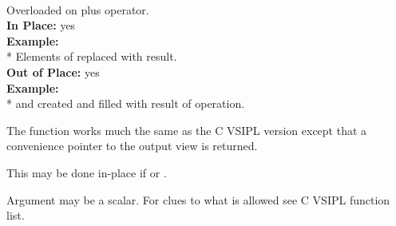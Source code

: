 \pyjvsiph
\\\vmthdh
\hspace*{.06\textwidth}Overloaded on plus operator.\\
\hspace*{.06\textwidth}\textbf{In Place: }\hspace{.2cm} yes\\
\hspace*{.08\textwidth}\textbf{Example: }\\*
\hspace*{.1\textwidth}Elements of  replaced with result.\\
\hspace*{.06\textwidth}\textbf{Out of Place: }\hspace{.2cm} yes\\
\hspace*{.08\textwidth}\textbf{Example: }\\*
\hspace*{.1\textwidth} and  created and filled with result of operation.
\begin{comments}
\item{The  function works much the same as the C VSIPL version except that a convenience pointer to the output view is returned.}
\item{This may be done in-place if  or .}
\item{Argument  may be a scalar. For clues to what is allowed see C VSIPL function list.}
\end{comments}
